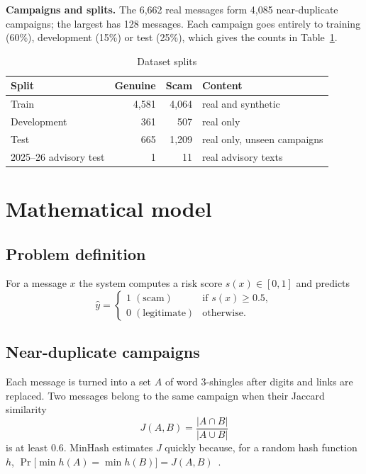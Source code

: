 \documentclass[12pt,a4paper]{report}
\begin{document}
\textbf{Campaigns and splits.} The 6,662 real messages form 4,085 near-duplicate campaigns; the largest has 128 messages. Each campaign goes entirely to training (60\%), development (15\%) or test (25\%), which gives the counts in Table~\ref{tab:splits}.

\begin{table}[H]
\centering
\caption{Dataset splits}
\label{tab:splits}
\begin{tabular}{|l|r|r|l|}
\hline
\textbf{Split} & \textbf{Genuine} & \textbf{Scam} & \textbf{Content} \\
\hline
Train & 4,581 & 4,064 & real and synthetic \\
\hline
Development & 361 & 507 & real only \\
\hline
Test & 665 & 1,209 & real only, unseen campaigns \\
\hline
2025--26 advisory test & 1 & 11 & real advisory texts \\
\hline
\end{tabular}
\end{table}

\section{Mathematical model}

\subsection{Problem definition}
For a message $x$ the system computes a risk score $s(x)\in[0,1]$ and predicts
\begin{equation}
\hat{y}=\begin{cases}1 \;(\text{scam}) & \text{if } s(x)\ge 0.5,\\ 0 \;(\text{legitimate}) & \text{otherwise.}\end{cases}
\end{equation}

\subsection{Near-duplicate campaigns}
Each message is turned into a set $A$ of word 3-shingles after digits and links are replaced. Two messages belong to the same campaign when their Jaccard similarity
\begin{equation}
J(A,B)=\frac{|A\cap B|}{|A\cup B|}
\end{equation}
is at least 0.6. MinHash estimates $J$ quickly because, for a random hash function $h$, $\Pr\big[\min h(A)=\min h(B)\big]=J(A,B)$~\cite{broder1997resemblance}.
\end{document}
